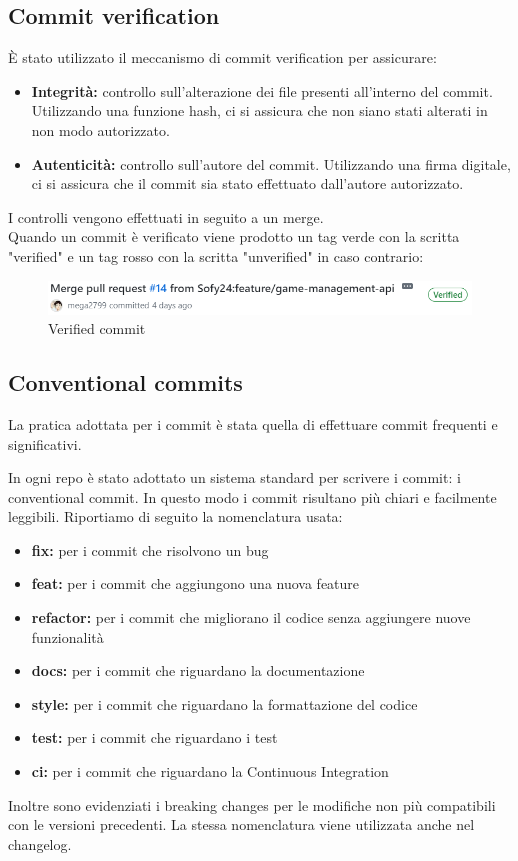 \subsection{Commit verification}
È stato utilizzato il meccanismo di commit verification per assicurare:
\begin{itemize}
    \item \textbf{Integrità:} controllo sull'alterazione dei file presenti all'interno del commit.  Utilizzando una funzione hash, ci si assicura che non siano stati alterati in non modo autorizzato.
    \item \textbf{Autenticità:} controllo sull'autore del commit. Utilizzando una firma digitale, ci si assicura che il commit sia stato effettuato dall'autore autorizzato.
\end{itemize}
I controlli vengono effettuati in seguito a un merge. \\
Quando un commit è verificato viene prodotto un tag verde con la scritta "verified" e un tag rosso con la scritta "unverified" in caso contrario:
\begin{figure}[h!]
    \centering 
    \includegraphics[scale=0.7]{report/img/verified_commit.png}
    \caption{Verified commit}
    \label{verified_commit}
    \end{figure}
\subsection{Conventional commits}
La pratica adottata per i commit è stata quella di effettuare commit frequenti e significativi.

In ogni repo è stato adottato un sistema standard per scrivere i commit:  i conventional commit. In questo modo i commit risultano più chiari e facilmente leggibili. 
Riportiamo di seguito la nomenclatura usata:
\begin{itemize}
    \item \textbf{fix:} per i commit che risolvono un bug
    \item \textbf{feat:} per i commit che aggiungono una nuova feature
    \item \textbf{refactor:} per i commit che migliorano il codice senza aggiungere nuove funzionalità
    \item \textbf{docs:} per i commit che riguardano la documentazione
    \item \textbf{style:} per i commit che riguardano la formattazione del codice
    \item \textbf{test:} per i commit che riguardano i test
    \item \textbf{ci:} per i commit che riguardano la Continuous Integration
\end{itemize}
Inoltre sono evidenziati i breaking changes per le modifiche non più compatibili con le versioni precedenti.
La stessa nomenclatura viene utilizzata anche nel changelog.


